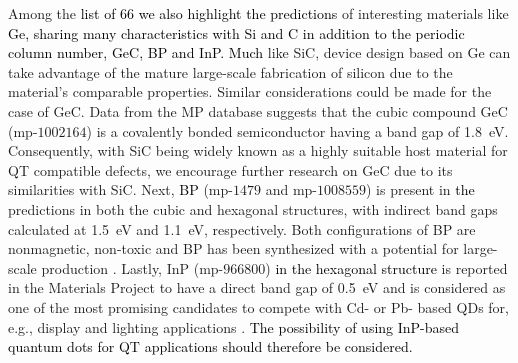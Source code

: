 \documentclass[superscriptaddress,unsortedaddress,
 amsmath,amssymb,
 aps,
]{revtex4-2}
\newcommand{\mrk}[1]{\textcolor{black}{#1}}
\begin{document}
Among the \mrk{list of $66$ we also highlight the predictions} of interesting materials like \mrk{Ge, sharing many characteristics with Si and C in addition to the periodic column number,  %
GeC, BP and InP.}  
\mrk{Much} like SiC, device design based on Ge can take advantage of the mature large-scale fabrication of silicon due to the material's comparable properties.  
Similar considerations could be made for the case of GeC. 
Data from the MP database suggests that the cubic compound GeC (mp-$1002164$) is a covalently bonded semiconductor having a band gap of \SI{1.8}{\electronvolt}. 
Consequently, with SiC being widely known as a highly suitable host material for QT compatible defects, we encourage further research on GeC due to its similarities with SiC. 
Next, \mrk{BP} (mp-$1479$ and mp-$1008559$) is present in \mrk{the} predictions in both the cubic and hexagonal structures, with indirect band gaps calculated at \SI{1.5}{\electronvolt} and \SI{1.1}{\electronvolt}, respectively. Both configurations of BP are nonmagnetic, non-toxic and BP has been synthesized with a potential for large-scale production \cite{MukhanovVladimirA2016Umso}. 
Lastly, InP (mp-$966800$) 
\mrk{in the hexagonal structure} 
is reported in the Materials Project to have a direct band gap of \SI{0.5}{\electronvolt} and is considered as one of the most promising candidates to compete with Cd- or Pb- based QDs for, e.g., display and lighting applications  \cite{Zhang2020a, Won2019}. 
\mrk{The possibility of using InP-based quantum dots for QT applications should therefore be considered.}  

\end{document}
